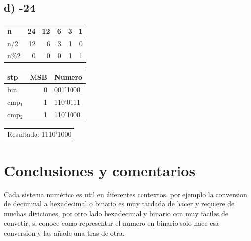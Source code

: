 \documentclass[12pt]{article}
\begin{document}
\subsection*{d) -24}
\label{sec:orgea62864}
\begin{mdframed}
\begin{center}
\begin{tabular}{lrrrrr}
n & 24 & 12 & 6 & 3 & 1\\
\hline
n/2 & 12 & 6 & 3 & 1 & 0\\
n\%2 & 0 & 0 & 0 & 1 & 1\\
\end{tabular}
\end{center}

\begin{center}
\begin{tabular}{lrl}
stp & MSB & Numero\\
\hline
bin & 0 & 001'1000\\
cmp\(_{\text{1}}\) & 1 & 110'0111\\
cmp\(_{\text{2}}\) & 1 & 110'1000\\
\end{tabular}
\end{center}

\begin{center}
\begin{tabular}{l}
Resultado: 1110'1000\\
\end{tabular}
\end{center}
\end{mdframed}
\section*{Conclusiones y comentarios}
\label{sec:org6698b21}
Cada sistema numérico es util en diferentes contextos, por ejemplo la conversion de deciminal a hexadecimal o binario es muy tardada de hacer y requiere de muchas diviciones, por otro lado hexadecimal y binario con muy faciles de convetir, si conoce como representar el numero en binario solo hace esa conversion y las añade una tras de otra. 
\end{document}
